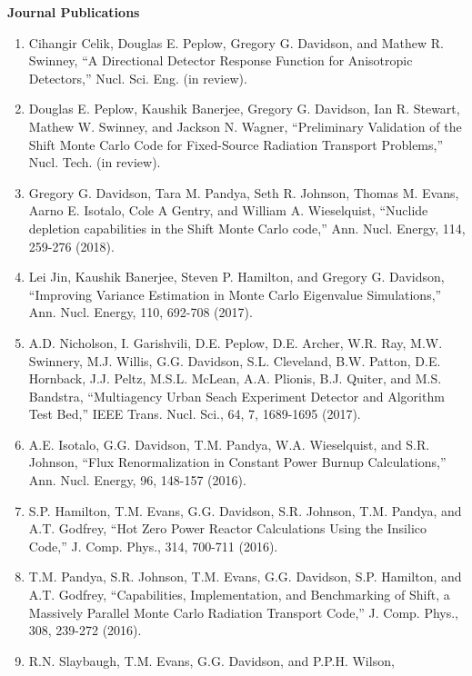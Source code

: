 \documentclass[letterpaper,11pt]{article}
\newlength{\outerbordwidth}
\newcommand{\resheading}[1]{\vspace{8pt}
  \parbox{\textwidth}{\setlength{\FrameSep}{\outerbordwidth}
    \begin{shaded}
      \setlength{\fboxsep}{0pt}\framebox[\textwidth][l]{\setlength{\fboxsep}{4pt}\fcolorbox{shadecolorB}{shadecolorB}{\textbf{\sffamily{\mbox{~}\makebox[6.762in][l]{\large #1} \vphantom{p\^{E}}}}}}
    \end{shaded}
  }\vspace{-5pt}
}
\newcommand{\leftsubheading}[1]{
  \textbf{#1\vspace{-6pt} \\}}
\begin{document}
\resheading{Publications}

\leftsubheading{Journal Publications}
\begin{enumerate}
  \item Cihangir Celik, Douglas E. Peplow, Gregory G. Davidson, and
    Mathew R. Swinney, ``A Directional Detector Response Function for
    Anisotropic Detectors,'' Nucl. Sci. Eng. (in review).
  \item Douglas E. Peplow, Kaushik Banerjee, Gregory G. Davidson, Ian
    R. Stewart, Mathew W. Swinney, and Jackson N. Wagner, ``Preliminary
    Validation of the Shift Monte Carlo Code for Fixed-Source
    Radiation Transport Problems,'' Nucl. Tech. (in review).
  \item Gregory G. Davidson, Tara M. Pandya, Seth R. Johnson, Thomas
    M. Evans, Aarno E. Isotalo, Cole A Gentry, and William
    A. Wieselquist, ``Nuclide depletion capabilities in the Shift Monte
    Carlo code,'' Ann. Nucl. Energy, 114, 259-276 (2018).
  \item Lei Jin, Kaushik Banerjee, Steven P. Hamilton, and Gregory
    G. Davidson, ``Improving Variance Estimation in Monte Carlo
    Eigenvalue Simulations,'' Ann. Nucl. Energy, 110, 692-708 (2017).
  \item A.D. Nicholson, I. Garishvili, D.E. Peplow, D.E. Archer,
    W.R. Ray, M.W. Swinnery, M.J. Willis, G.G. Davidson,
    S.L. Cleveland, B.W. Patton, D.E. Hornback, J.J. Peltz,
    M.S.L. McLean, A.A. Plionis, B.J. Quiter, and M.S. Bandstra,
    ``Multiagency Urban Seach Experiment Detector and Algorithm Test
    Bed,'' IEEE Trans. Nucl. Sci., 64, 7, 1689-1695 (2017).
  \item A.E. Isotalo, G.G. Davidson, T.M. Pandya, W.A. Wieselquist,
    and S.R. Johnson, ``Flux Renormalization in Constant Power Burnup
    Calculations,'' Ann. Nucl. Energy, 96, 148-157 (2016).
  \item S.P. Hamilton, T.M. Evans, G.G. Davidson, S.R. Johnson,
    T.M. Pandya, and A.T. Godfrey, ``Hot Zero Power Reactor
    Calculations Using the Insilico Code,'' J. Comp. Phys., 314,
    700-711 (2016).
  \item T.M. Pandya, S.R. Johnson, T.M. Evans, G.G. Davidson,
    S.P. Hamilton, and A.T. Godfrey, ``Capabilities, Implementation,
    and Benchmarking of Shift, a Massively Parallel Monte Carlo
    Radiation Transport Code,'' J. Comp. Phys., 308, 239-272 (2016).
  \item R.N. Slaybaugh, T.M. Evans, G.G. Davidson, and P.P.H. Wilson,

\end{enumerate}
\end{document}
